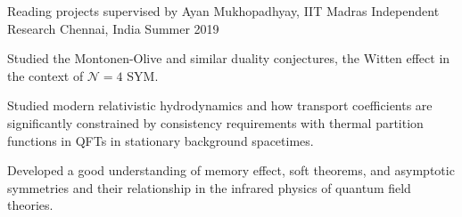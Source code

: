 \begin{cventries}
  \cventry
    {Reading projects supervised by Ayan Mukhopadhyay, IIT Madras} %
    {Independent Research} %
    {Chennai, India} %
    {Summer 2019} %
    {
      \begin{cvitems} %
        \item {Studied the Montonen-Olive and similar duality conjectures, the Witten effect in the context of $\mathcal{N}=4$ SYM.}
        \item {Studied modern relativistic hydrodynamics and how transport coefficients are significantly constrained by consistency requirements with thermal partition functions in QFTs in stationary background spacetimes.}
        \item {Developed a good understanding of memory effect, soft theorems, and asymptotic symmetries and their relationship in the infrared physics of quantum field theories.}
      \end{cvitems}
    }


\end{cventries}







